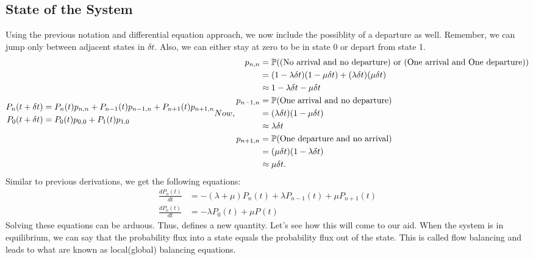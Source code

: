 \documentclass[11pt, a4paper]{report}
\begin{document}
\subsection{State of the System}
Using the previous notation and differential equation approach, we now include the possiblity of a departure as well. Remember, we can jump only between adjacent states in $\delta t$. Also, we can either stay at zero to be in state 0 or depart from state 1.
\begin{subequations}
    \begin{align}
        P_n(t + \delta t) &= P_n(t) p_{n, n} + P_{n-1}(t)p_{n-1, n} + P_{n+1}(t) p_{n+1, n} \\
        P_0(t + \delta t) &= P_0(t)p_{0, 0} + P_1(t)p_{1, 0}
    \end{align}
    Now, 
    \begin{align}
        p_{n, n} &= \sP(\text{(No arrival and no departure) or (One arrival and One departure)}) \\ 
        &= (1 - \lambda \delta t)(1 - \mu \delta t) + (\lambda \delta t)(\mu \delta t) \\
        &\approx 1 - \lambda \delta t - \mu \delta t \\
        p_{n-1, n} &= \sP(\text{One arrival and no departure}) \\
        &= (\lambda \delta t)(1 - \mu \delta t) \\
        &\approx \lambda \delta t \\
        p_{n+1, n} &= \sP(\text{One departure and no arrival})\\
        &= (\mu \delta t)(1 - \lambda \delta t) \\
        & \approx \mu \delta t.  
    \end{align}  
    \label{eq:stateMM1}
\end{subequations}
Similar to previous derivations, we get the following equations:
\begin{subequations}
    \begin{align}
        \frac{d P_n(t)}{d t} &= -(\lambda + \mu) P_n(t) + \lambda P_{n-1}(t) + \mu P_{n+1}(t) \\
        \frac{d P_0(t)}{d t} &= -\lambda P_0(t) + \mu P_{}(t) 
    \end{align}
\end{subequations}
Solving these equations can be arduous. Thus, \cite{RobertazziQ} defines a new quantity. Let's see how this will come to our aid.
When the system is in equilibrium, we can say that the probability flux into a state equals the probability flux out of the state. This is called flow balancing and leads to what are known as local(global) balancing equations.
\end{document}
